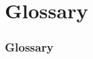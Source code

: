 \documentclass[english]{article}
\newcommand{\shortname}{GR}
\begin{document}


\newpage
\begin{htmlonly}
\end{htmlonly}
\part{Glossary}

\setcounter{section}{0}
\renewcommand{\thesection}{\shortname\arabic{section}}
\renewcommand{\thesubsection}{\shortname\arabic{section}.\arabic{subsection}}
\renewcommand{\thesubsubsection}{\shortname\arabic{section}.\arabic{subsection}.\arabic{subsubsection}}

\section{Glossary}

\end{document}
